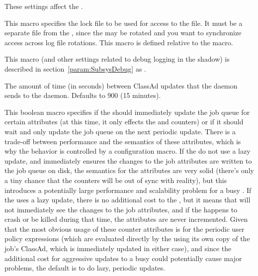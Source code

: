 These settings affect the .
\begin{description}

\label{param:ShadowLock}
\item[\Macro{SHADOW\_LOCK}]
  This macro specifies the lock file to be used for access to the
   file.  It must be a separate file from the
  , since the  may be rotated 
  and you want to synchronize access across log file rotations.
  This macro is defined relative to the  macro.

\label{param:ShadowDebug}
\item[\Macro{SHADOW\_DEBUG}]
  This macro (and other settings related to debug logging in the shadow) is
  described in section~\ref{param:SubsysDebug} as
  .

\label{param:ShadowQueueUpdateInterval}
\item[\Macro{SHADOW\_QUEUE\_UPDATE\_INTERVAL}]
  The amount of time (in seconds) between ClassAd updates that the
   daemon sends to the  daemon.
  Defaults to 900 (15 minutes).

\label{param:ShadowLazyQueueUpdate}
\item[\Macro{SHADOW\_LAZY\_QUEUE\_UPDATE}]
  This boolean macro specifies if the  should
  immediately update the job queue for certain attributes (at this
  time, it only effects the  and
   counters) or if it should wait and only
  update the job queue on the next periodic update.
  There is a trade-off between performance and the semantics of these
  attributes, which is why the behavior is controlled by a
  configuration macro.
  If the  do not use a lazy update, and immediately
  ensures the changes to the job attributes are written to the job
  queue on disk, the semantics for the attributes are very solid
  (there's only a tiny chance that the counters will be out of sync
  with reality), but this introduces a potentially large performance
  and scalability problem for a busy .
  If the  uses a lazy update, there is no additional cost
  to the , but it means that  will not
  immediately see the changes to the job attributes, and if the
   happens to crash or be killed during that time, the
  attributes are never incremented.
  Given that the most obvious usage of these counter attributes is for
  the periodic user policy expressions (which are evaluated directly
  by the  using its own copy of the job's ClassAd,
  which is immediately updated in either case), and since the
  additional cost for aggressive updates to a busy 
  could potentially cause major problems, the default is 
  to do lazy, periodic updates.


\end{description}
